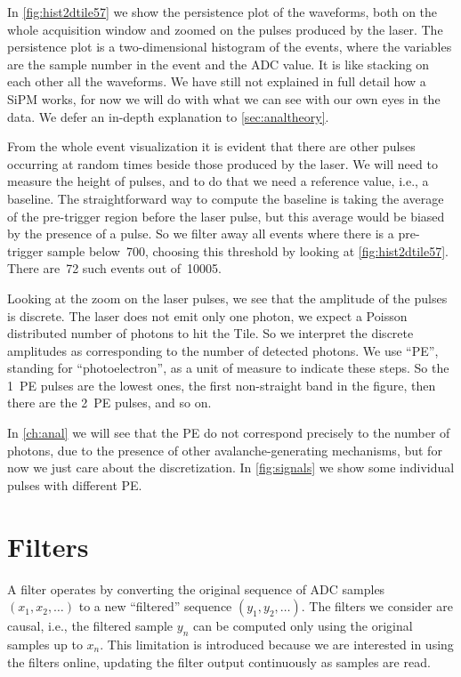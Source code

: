 In \autoref{fig:hist2dtile57} we show the persistence plot of the waveforms,
both on the whole acquisition window and zoomed on the pulses produced by the
laser. The persistence plot is a two-dimensional histogram of the events, where
the variables are the sample number in the event and the ADC value. It is like
stacking on each other all the waveforms. We have still not explained in full
detail how a SiPM works, for now we will do with what we can see with our own
eyes in the data. We defer an in-depth explanation to \autoref{sec:analtheory}.

From the whole event visualization it is evident that there are other pulses
occurring at random times beside those produced by the laser. We will need to
measure the height of pulses, and to do that we need a reference value, i.e., a
baseline. The straightforward way to compute the baseline is taking the average
of the pre-trigger region before the laser pulse, but this average would be
biased by the presence of a pulse. So we filter away all events where there is
a pre-trigger sample below~700, choosing this threshold by looking at
\autoref{fig:hist2dtile57}. There are~72 such events out of~\num{10005}.

Looking at the zoom on the laser pulses, we see that the amplitude of the
pulses is discrete. The laser does not emit only one photon, we expect a
Poisson distributed number of photons to hit the Tile. So we interpret the
discrete amplitudes as corresponding to the number of detected photons. We use
``PE'', standing for ``photoelectron'', as a unit of measure to indicate these
steps. So the \SI{1}{PE} pulses are the lowest ones, the first non-straight
band in the figure, then there are the \SI{2}{PE} pulses, and so on.

In \autoref{ch:anal} we will see that the PE do not correspond precisely to the
number of photons, due to the presence of other avalanche-generating
mechanisms, but for now we just care about the discretization. In
\autoref{fig:signals} we show some individual pulses with different PE.

\section{Filters}
\label{sec:filters}

A filter operates by converting the original sequence of ADC samples $(x_1,
x_2, \ldots)$ to a new ``filtered'' sequence $(y_1, y_2, \ldots)$. The filters
we consider are causal, i.e., the filtered sample $y_n$ can be computed only
using the original samples up to $x_n$. This limitation is introduced because
we are interested in using the filters online, updating the filter output
continuously as samples are read.

